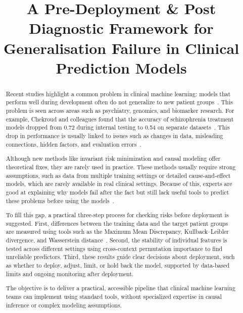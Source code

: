 \documentclass[conference]{IEEEtran}
\begin{document}
\title{A Pre-Deployment \& Post Diagnostic Framework for Generalisation Failure
in Clinical Prediction Models}

\author{
}

\maketitle

\begin{abstract}
Recent studies highlight a common problem in clinical machine learning: models that perform well during development often do not generalize to new patient groups~\cite{collins2024tripod, whalen2022pitfalls}. This problem is seen across areas such as psychiatry, genomics, and biomarker research. For example, Chekroud and colleagues found that the accuracy of schizophrenia treatment models dropped from 0.72 during internal testing to 0.54 on separate datasets~\cite{chekroud2024illusory}. This drop in performance is usually linked to issues such as changes in data, misleading connections, hidden factors, and evaluation errors~\cite{whalen2022pitfalls, bendavid2010theory}.

Although new methods like invariant risk minimization and causal modeling offer theoretical fixes, they are rarely used in practice\cite{worheide2021shift}. These methods usually require strong assumptions, such as data from multiple training settings or detailed cause-and-effect models, which are rarely available in real clinical settings. Because of this, experts are good at explaining why models fail after the fact but still lack useful tools to predict these problems before using the models~\cite{collins2024tripod}.

To fill this gap, a practical three-step process for checking risks before deployment is suggested. First, differences between the training data and the target patient groups are measured using tools such as the Maximum Mean Discrepancy, Kullback--Leibler divergence, and Wasserstein distance~\cite{gretton2012kernel, duchi2018learning, rahimian2019dro}. Second, the stability of individual features is tested across different settings using cross-context permutation importance to find unreliable predictors. Third, these results guide clear decisions about deployment, such as whether to deploy, adjust, limit, or hold back the model, supported by data-based limits and ongoing monitoring after deployment.

The objective is to deliver a practical, accessible pipeline that clinical machine learning teams can implement using standard tools, without specialized expertise in causal inference or complex modeling assumptions.
\end{abstract}
\end{document}
